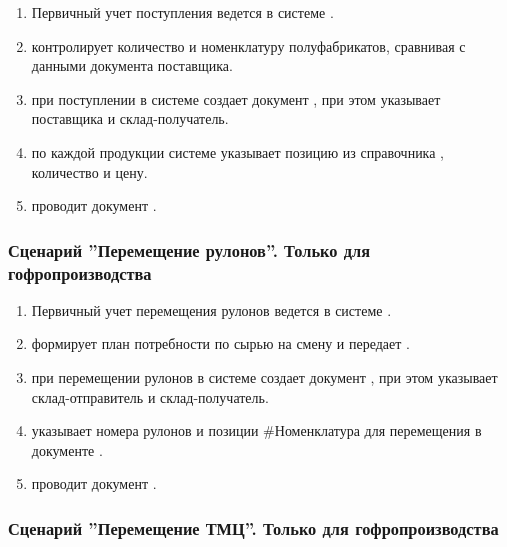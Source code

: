 \begin{enumerate}
\item Первичный учет поступления ведется в системе \gofro.
\item \kladovshik контролирует количество и номенклатуру полуфабрикатов, сравнивая с данными документа поставщика.
\item \kladovshik  при поступлении в системе \gofro создает документ , при этом указывает поставщика и склад-получатель. 
\item \kladovshik  по каждой продукции системе \gofro указывает позицию из справочника , количество и цену.
\item \kladovshik  проводит документ .



\end{enumerate}



\subsubsection{Сценарий ''Перемещение рулонов''. Только для гофропроизводства}
\label{bp:storage_6}

\begin{enumerate}
\item  	Первичный учет перемещения рулонов ведется в системе \gofro.
\item 	\planner формирует план потребности по сырью на смену и передает \gaoperator.
\item	\kladovshik  при перемещении рулонов в системе \gofro создает документ ,
при этом указывает склад-отправитель и склад-получатель.
\item 	\kladovshik  указывает номера рулонов и позиции \#Номенклатура для перемещения в документе .
\item 	\kladovshik проводит документ .
\end{enumerate}



\subsubsection{Сценарий ''Перемещение ТМЦ''. Только для гофропроизводства}
\label{bp:storage_61}

